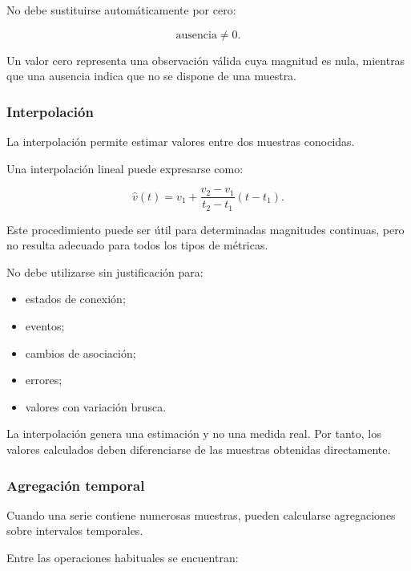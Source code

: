 No debe sustituirse automáticamente por cero:

\[
    \text{ausencia}
    \neq
    0.
\]

Un valor cero representa una observación válida cuya magnitud es nula,
mientras que una ausencia indica que no se dispone de una muestra.


\subsubsection*{Interpolación}

La interpolación permite estimar valores entre dos muestras conocidas.

Una interpolación lineal puede expresarse como:

\[
    \hat{v}(t)
    =
    v_1
    +
    \frac{
        v_2-v_1
    }{
        t_2-t_1
    }
    (t-t_1).
\]

Este procedimiento puede ser útil para determinadas magnitudes
continuas, pero no resulta adecuado para todos los tipos de métricas.

No debe utilizarse sin justificación para:

\begin{itemize}
    \item estados de conexión;

    \item eventos;

    \item cambios de asociación;

    \item errores;

    \item valores con variación brusca.
\end{itemize}

La interpolación genera una estimación y no una medida real. Por tanto,
los valores calculados deben diferenciarse de las muestras obtenidas
directamente.


\subsubsection*{Agregación temporal}

Cuando una serie contiene numerosas muestras, pueden calcularse
agregaciones sobre intervalos temporales.

Entre las operaciones habituales se encuentran:


